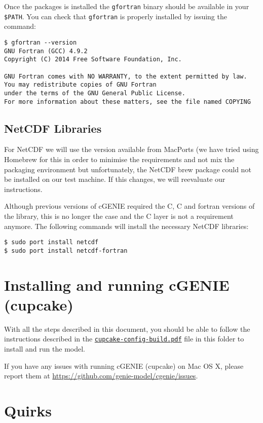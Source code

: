 \documentclass{scrartcl}
\DeclareRobustCommand\Cpp{\hbox{C\hspace{-.05em}\raisebox{.2ex}{\textbf{+\kern-.2ex+}}}}
\begin{document}
Once the packages is installed the \texttt{gfortran} binary should be available
in your \verb|$PATH|. You can check that \texttt{gfortran} is properly
installed by issuing the command:

\begin{verbatim}
$ gfortran --version
GNU Fortran (GCC) 4.9.2
Copyright (C) 2014 Free Software Foundation, Inc.

GNU Fortran comes with NO WARRANTY, to the extent permitted by law.
You may redistribute copies of GNU Fortran
under the terms of the GNU General Public License.
For more information about these matters, see the file named COPYING
\end{verbatim}

\subsection{NetCDF Libraries}

For NetCDF we will use the version available from MacPorts (we have tried using
Homebrew for this in order to minimise the requirements and not mix the
packaging environment but unfortunately, the NetCDF brew package could not be
installed on our test machine. If this changes, we will reevaluate our
instructions.

Although previous versions of cGENIE required the C, \Cpp{} and fortran versions
of the library, this is no longer the case and the \Cpp{} layer is not a
requirement anymore. The following commands  will install the necessary NetCDF
libraries:

\begin{verbatim}
$ sudo port install netcdf
$ sudo port install netcdf-fortran
\end{verbatim}

\section{Installing and running cGENIE (cupcake)}

With all the steps described in this document, you should be able to follow the
instructions described in the
\href{run:./cupcake-config-build.pdf}{\texttt{cupcake-config-build.pdf}} file
in this folder to install and run the model.

If you have any issues with running cGENIE (cupcake) on Mac OS X, please report
them at \url{https://github.com/genie-model/cgenie/issues}.

\section{Quirks}
\end{document}
